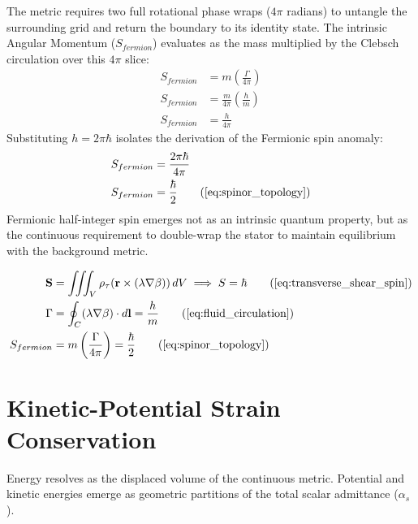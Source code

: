 The metric requires two full rotational phase wraps ($4\pi$ radians) to untangle the surrounding grid and return the boundary to its identity state. The intrinsic Angular Momentum ($S_{fermion}$) evaluates as the mass multiplied by the Clebsch circulation over this $4\pi$ slice: 
\begin{align}
    S_{fermion} &= m \left( \frac{\Gamma}{4\pi} \right)  \\
    S_{fermion} &= \frac{m}{4\pi} \left( \frac{h}{m} \right)  \\
    S_{fermion} &= \frac{h}{4\pi} 
\end{align}
Substituting $h = 2\pi\hbar$ isolates the derivation of the Fermionic spin anomaly:
\begin{align}
    S_{fermion} &= \frac{2\pi\hbar}{4\pi}  \\
    S_{fermion} &= \frac{\hbar}{2} \tag{\ref{eq:spinor_topology}}
\end{align}
Fermionic half-integer spin emerges not as an intrinsic quantum property, but as the continuous requirement to double-wrap the stator to maintain equilibrium with the background metric. 

\begin{tcolorbox}[recallbox, title={\ref{box:quantum_spin}. Kinematic Circulation \& The Origin of Spin}] %
\begin{align}
    \mathbf{S} &= \iiint_V \rho_{\tau} (\mathbf{r} \times (\lambda \nabla \beta)) \, dV \implies S = \hbar \tag{\ref{eq:transverse_shear_spin}} \\ %
    \Gamma &= \oint_C (\lambda \nabla \beta) \cdot d\mathbf{l} = \frac{h}{m} \tag{\ref{eq:fluid_circulation}} \\
    S_{fermion} &= m \left( \frac{\Gamma}{4\pi} \right) = \frac{\hbar}{2} \tag{\ref{eq:spinor_topology}}
\end{align}
\end{tcolorbox}

\section{Kinetic-Potential Strain Conservation}
\label{sec:deriv_volumetric_energy}

Energy resolves as the displaced volume of the continuous metric. Potential and kinetic energies emerge as geometric partitions of the total scalar admittance ($\alpha_s$). 

